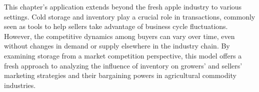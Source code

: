 \documentclass[12pt,authoryear, notitlepage]{elegantpaper}
\begin{document}
This chapter's application extends beyond the fresh apple industry to various settings. Cold storage and inventory play a crucial role in transactions, commonly seen as tools to help sellers take advantage of business cycle fluctuations. However, the competitive dynamics among buyers can vary over time, even without changes in demand or supply elsewhere in the industry chain. By examining storage from a market competition perspective, this model offers a fresh approach to analyzing the influence of inventory on growers' and sellers' marketing strategies and their bargaining powers in agricultural commodity industries.












\newpage


\appendix

\newpage

\end{document}
